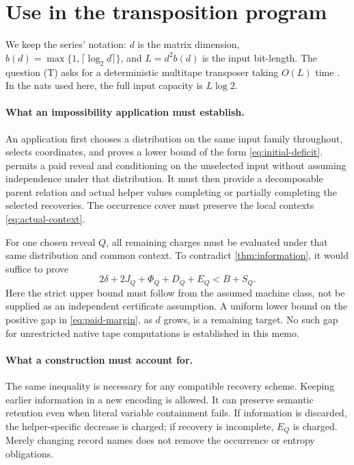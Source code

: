 \section{Use in the transposition program}\label{sec:applications}

We keep the series' notation: $d$ is the matrix dimension,
$b(d)=\max\{1,\lceil\log_2d\rceil\}$, and $L=d^2b(d)$ is the input
bit-length. The question (T) asks for a deterministic multitape
transposer taking $O(L)$ time \cite{FirstPaper2026}. In the nats used
here, the full input capacity is $L\log 2$.

\paragraph{What an impossibility application must establish.}
An application first chooses a distribution on the same input family
throughout, selects coordinates, and proves a lower bound of the form
\eqref{eq:initial-deficit}.  permits a paid reveal
and conditioning on the unselected input without assuming independence
under that distribution. It must then provide a decomposable parent
relation and actual helper values completing or partially completing
the selected recoveries. The occurrence cover must preserve the local
contexts \eqref{eq:actual-context}.

For one chosen reveal $Q$, all remaining charges must be evaluated
under that same distribution and common context. To contradict
\cref{thm:information}, it would suffice to prove
\begin{equation}
2\delta+2J_Q+\Phi_Q+D_Q+E_Q<B+S_Q.
\label{eq:paid-margin}
\end{equation}
Here the strict upper bound must follow from the assumed machine
class, not be supplied as an independent certificate assumption. A
uniform lower bound on the positive gap in
\eqref{eq:paid-margin}, as $d$ grows, is a remaining target. No such
gap for unrestricted native tape computations is established in this
memo.

\paragraph{What a construction must account for.}
The same inequality is necessary for any compatible recovery scheme.
Keeping earlier information in a new encoding is allowed. It can
preserve semantic retention even when literal variable containment
fails. If information is discarded, the helper-specific decrease is
charged; if recovery is incomplete, $E_Q$ is charged. Merely changing
record names does not remove the occurrence or entropy obligations.

